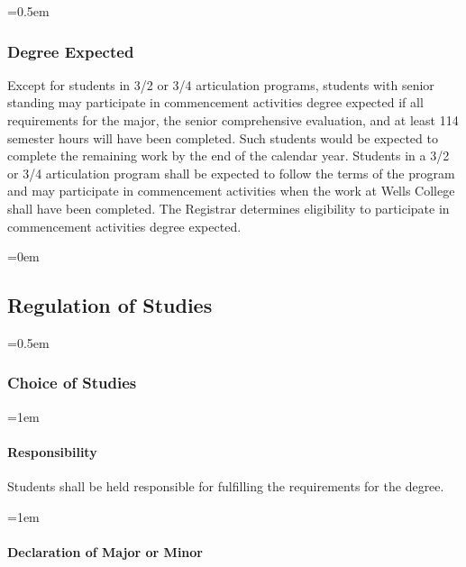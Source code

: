 \documentclass{manual}
\newcommand{\modified}[1]{}
\newcommand{\oldbreak}[1]{}
\let\oldsubsection\subsection
\renewcommand\subsection{\leftskip=0em\oldsubsection}
\let\oldsubsubsection\subsubsection
\renewcommand\subsubsection{\leftskip=0.5em\oldsubsubsection}
\let\oldparagraph\paragraph
\renewcommand\paragraph{\leftskip=1em\oldparagraph}
\begin{document}
\subsubsection{Degree Expected}

 Except\modified{9/9/97}  for students in 3/2 or 3/4 articulation programs, students with senior standing may participate in commencement activities degree expected if all requirements for the major, the senior comprehensive evaluation, and at least 114 semester hours will have been completed. Such students would be expected to complete the remaining work by the end of the calendar year. Students in a 3/2 or 3/4 articulation program shall be expected to follow the terms of the program and may participate in commencement activities when the work at Wells College shall have been completed. The Registrar determines eligibility to participate in commencement activities degree expected.



\oldbreak{IV-3}



\subsection{Regulation of Studies}\label{sec:RegulationOfStudies}

\subsubsection{Choice of Studies}\label{sub:ChoiceOfStudies}

\paragraph{Responsibility}

Students shall be held responsible for fulfilling the requirements for the degree.

\paragraph{Declaration of Major or Minor}
\end{document}
